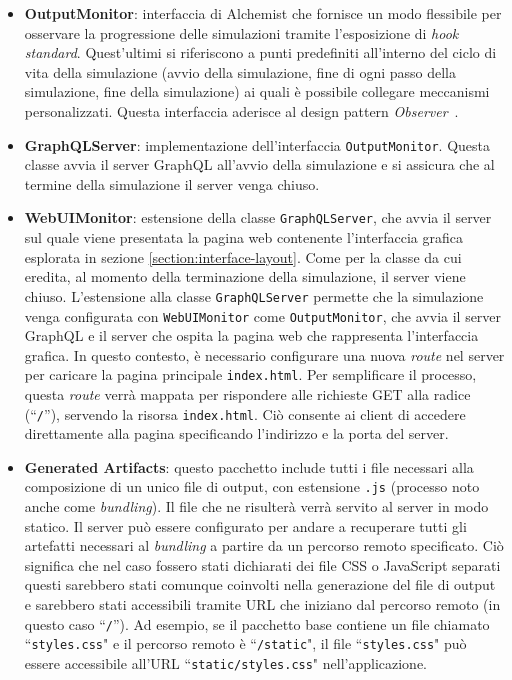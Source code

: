 \begin{itemize}
	\item \textbf{OutputMonitor}: interfaccia di Alchemist che fornisce un modo flessibile per osservare la progressione delle simulazioni tramite l'esposizione di \textit{hook standard}.  Quest'ultimi si riferiscono a punti predefiniti all'interno del ciclo di vita della simulazione (avvio della simulazione, fine di ogni passo della simulazione, fine della simulazione) ai quali è possibile collegare meccanismi personalizzati. Questa interfaccia aderisce al design pattern \textit{Observer}~\cite{Gamma1994}.
	\item \textbf{GraphQLServer}: implementazione dell'interfaccia  \texttt{OutputMonitor}. Questa classe avvia il server GraphQL all'avvio della simulazione e si assicura che al termine della simulazione il server venga chiuso.
    \item \textbf{WebUIMonitor}: estensione della classe \texttt{GraphQLServer}, che avvia il server sul quale viene presentata la pagina web contenente l'interfaccia grafica esplorata in sezione \ref{section:interface-layout}. Come per la classe da cui eredita, al momento della terminazione della simulazione, il server viene chiuso. L'estensione alla classe \texttt{GraphQLServer} permette che la simulazione venga configurata con \texttt{WebUIMonitor} come \texttt{OutputMonitor}, che avvia il server GraphQL e il server che ospita la pagina web che rappresenta l'interfaccia grafica.
    In questo contesto, è necessario configurare una nuova \textit{route} nel server per caricare la pagina principale \texttt{index.html}. Per semplificare il processo, questa \textit{route} verrà mappata per rispondere alle richieste GET alla radice (``\texttt{/}''), servendo la risorsa \texttt{index.html}. Ciò consente ai client di accedere direttamente alla pagina specificando l'indirizzo e la porta del server.
	\item \textbf{Generated Artifacts}: questo pacchetto include tutti i file necessari alla composizione di un unico file di output, con estensione \texttt{.js} (processo noto anche come \textit{bundling}). Il file che ne risulterà verrà servito al server in modo statico. Il server può essere configurato per andare a recuperare tutti gli artefatti necessari al \textit{bundling} a partire da un percorso remoto specificato. Ciò significa che nel caso fossero stati dichiarati dei file CSS o JavaScript separati questi sarebbero stati comunque coinvolti nella generazione del file di output e sarebbero stati accessibili tramite \ac{URL} che iniziano dal percorso remoto (in questo caso ``\texttt{/}'').	
	Ad esempio, se il pacchetto base contiene un file chiamato ``\texttt{styles.css}" e il percorso remoto è ``\texttt{/static}", il file ``\texttt{styles.css}" può essere accessibile all'URL ``\texttt{static/styles.css}" nell'applicazione. 
	
\end{itemize}

